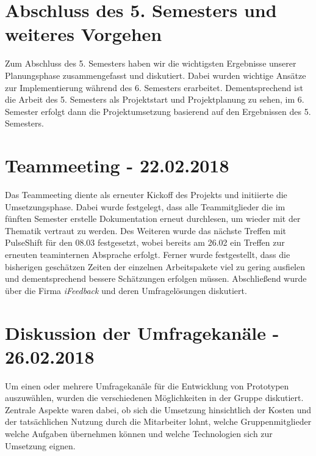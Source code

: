 \section{Abschluss des 5. Semesters und weiteres Vorgehen}
Zum Abschluss des 5. Semesters haben wir die wichtigsten Ergebnisse unserer Planungsphase zusammengefasst und diskutiert. Dabei wurden wichtige Ansätze zur Implementierung während des 6. Semesters erarbeitet. Dementsprechend ist die Arbeit des 5. Semesters als Projektstart und Projektplanung zu sehen, im 6. Semester erfolgt dann die Projektumsetzung basierend auf den Ergebnissen des 5. Semesters.

\section{Teammeeting - 22.02.2018}
Das Teammeeting diente als erneuter Kickoff des Projekts und initiierte die Umsetzungsphase. Dabei wurde festgelegt, dass alle Teammitglieder die im fünften Semester erstelle Dokumentation erneut durchlesen, um wieder mit der Thematik vertraut zu werden. Des Weiteren wurde das nächste Treffen mit PulseShift für den 08.03 festgesetzt, wobei bereits am 26.02 ein Treffen zur erneuten teaminternen Absprache erfolgt. Ferner wurde festgestellt, dass die bisherigen geschätzen Zeiten der einzelnen Arbeitspakete viel zu gering ausfielen und dementsprechend bessere Schätzungen erfolgen müssen. Abschließend wurde über die Firma \textit{iFeedback} und deren Umfragelösungen diskutiert.

\section{Diskussion der Umfragekanäle - 26.02.2018}
Um einen oder mehrere Umfragekanäle für die Entwicklung von Prototypen auszuwählen, wurden die verschiedenen Möglichkeiten in der Gruppe diskutiert. Zentrale Aspekte waren dabei, ob sich die Umsetzung hinsichtlich der Kosten und der tatsächlichen Nutzung durch die Mitarbeiter lohnt, welche Gruppenmitglieder welche Aufgaben übernehmen können und welche Technologien sich zur Umsetzung eignen.

